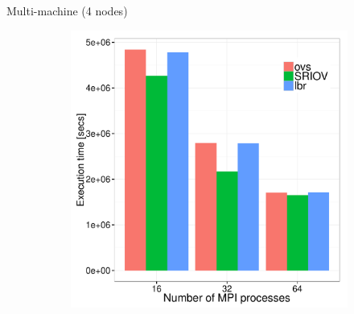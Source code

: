 \documentclass[11pt,xcolor=dvipsnames,presentation]{beamer}
\begin{document}
\begin{frame}[label=sec-4-0-11]{Multi-machine (4 nodes)}
\begin{figure}
\begin{subfigure}[b]{0.42\textwidth}
    \includegraphics[scale=0.25,angle=0]{figures/inter-container-epB.pdf}
  \end{subfigure}
\end{figure}
\end{frame}
\end{document}
